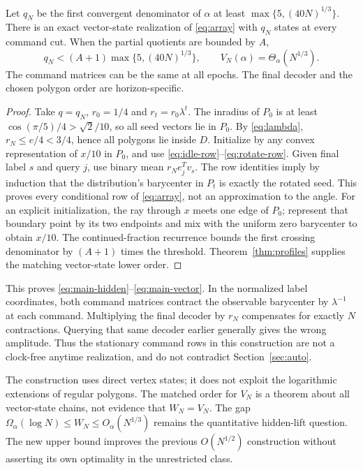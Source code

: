 \begin{theorem}\label{thm:upper}
Let $q_N$ be the first convergent denominator of $\alpha$ at least
$\max\{5,(40N)^{1/3}\}$. There is an exact vector-state realization
of \eqref{eq:array} with $q_N$ states at every command cut.
When the partial quotients are bounded by $A$,
\[
 q_N<(A+1)\max\{5,(40N)^{1/3}\},\qquad
                     V_N(\alpha)=\Theta_\alpha(N^{1/3}).
\]
The command matrices can be the same at all epochs. The final decoder
and the chosen polygon order are horizon-specific.
\end{theorem}
\begin{proof}
Take $q=q_N$, $r_0=1/4$ and $r_t=r_0\lambda^t$.
The inradius of $P_0$ is at least
$\cos(\pi/5)/4>\sqrt2/10$, so all seed vectors lie in $P_0$.
By \eqref{eq:lambda}, $r_N\le e/4<3/4$, hence all polygons lie
inside $D$. Initialize by any convex representation of $x/10$ in
$P_0$, and use \eqref{eq:idle-row}--\eqref{eq:rotate-row}.
Given final label $s$ and query $j$, use binary mean $r_Ne_j^Tv_s$.
The row identities imply by induction that the distribution's barycenter
in $P_t$ is exactly the rotated seed. This proves every conditional row
of \eqref{eq:array}, not an approximation to the angle.
For an explicit initialization, the ray through $x$ meets one edge of
$P_0$; represent that boundary point by its two endpoints and mix with
the uniform zero barycenter to obtain $x/10$.
The continued-fraction recurrence bounds the first crossing denominator
by $(A+1)$ times the threshold. Theorem~\ref{thm:profiles} supplies the
matching vector-state lower order.
\end{proof}

This proves \eqref{eq:main-hidden}--\eqref{eq:main-vector}. In the
normalized label coordinates, both command matrices contract the
observable barycenter by $\lambda^{-1}$ at each command. Multiplying the
final decoder by $r_N$ compensates for exactly $N$ contractions. Querying
that same decoder earlier generally gives the wrong amplitude. Thus the
stationary command rows in this construction are not a clock-free
anytime realization, and do not contradict Section~\ref{sec:auto}.

The construction uses direct vertex states; it does not exploit the
logarithmic extensions of regular polygons. The matched order for
$V_N$ is a theorem about all vector-state chains, not evidence that
$W_N=V_N$. The gap
$\Omega_\alpha(\log N)\le W_N\le O_\alpha(N^{1/3})$ remains the
quantitative hidden-lift question. The new upper bound improves the
previous $O(N^{1/2})$ construction without asserting its own optimality
in the unrestricted class.

